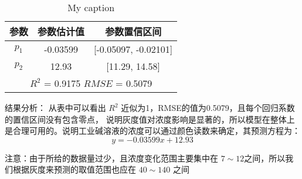     \begin{table}[H]
        \centering
        \caption{My caption}
        \label{my-label}
        \begin{tabular}{@{}ccc@{}}
        \toprule
        参数       & 参数估计值      & 参数置信区间                     \\ \midrule
        $p_1$    & -0.03599   & {[}-0.05097, -0.02101{]}   \\
        $p_2$    & 12.93      & {[}11.29, 14.58{]}         \\
        \hline
        \multicolumn{3}{c}{$R^2$ = 0.9175 $RMSE$ = 0.5079} \\ \bottomrule
        \end{tabular}
        \end{table}

    结果分析： 从表中可以看出 $R^2$ 近似为1，RMSE的值为0.5079，且每个回归系数的置信区间没有包含零点，
    说明灰度值对浓度影响是显著的，所以模型在整体上是合理可用的。说明工业碱溶液的浓度可以通过颜色读数来确定，其预测方程为：
        $$y = -0.03599 x + 12.93 $$

    注意：由于所给的数据量过少，且浓度变化范围主要集中在 $7 \sim 12$之间，所以我们根据灰度来预测的取值范围也应在 $40 \sim 140$
    之间

